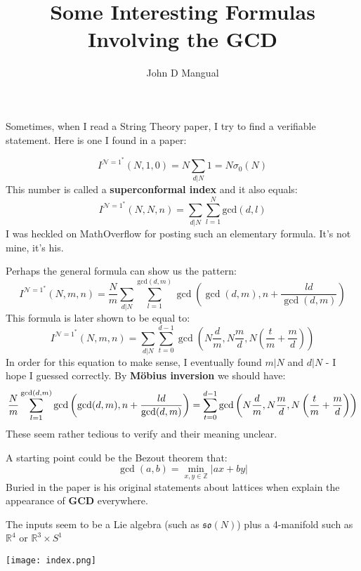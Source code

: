 \documentclass[12pt]{article}
\title{\textbf{ Some Interesting Formulas Involving the GCD }}
\author{John D Mangual}
\date{}
\begin{document}
\selectfont \fontsize{25}{30}\selectfont

\maketitle

Sometimes, when I read a String Theory paper, I try to find a verifiable statement.  Here is one I found in a paper:

$$ I^{\mathcal{N}=1^\ast}(N,1,0) = N \sum_{d| N} 1 = N \sigma_0(N) $$
This number is called a \textbf{superconformal index} and it also equals: 
$$ I^{\mathcal{N}=1^\ast}(N,N,n) =  \sum_{d| N} \sum_{l=1}^N \mathrm{gcd}(d,l ) $$
I was heckled on MathOverflow for posting such an elementary formula.  It's not mine, it's his.
\newpage

Perhaps the general formula can show us the pattern:
$$  I^{\mathcal{N}=1^\ast}(N,m,n) = \frac{N}{m} \sum_{d|N} \sum_{l=1}^{\mathrm{gcd}(d,m)}
\gcd\left( \gcd(d,m), n + \frac{ld}{\gcd(d,m)} \right)
$$
This formula is later shown to be equal to:
$$  I^{\mathcal{N}=1^\ast}(N,m,n) = 
 \sum_{d|N} \sum_{t=0}^{d-1} \gcd \left(N \frac{d}{m}, N \frac{m}{d}, N \left( \frac{t}{m} + \frac{m}{d} \right) \right)
$$
In order for this equation to make sense, I eventually found $m | N$ and $d | N$ - I hope I guessed correctly.  \newline \newline
By \textbf{M\"{o}bius inversion} we should have:
$$ \tiny \frac{N}{m}  \sum_{l=1}^{\mathrm{gcd}(d,m)}
\gcd\left( \gcd(d,m), n + \frac{ld}{\gcd(d,m)} \right)
= 
 \sum_{t=0}^{d-1} \gcd \left(N \frac{d}{m}, N \frac{m}{d}, N \left( \frac{t}{m} + \frac{m}{d} \right) \right)$$
These seem rather tedious to verify and their meaning unclear.

\newpage

A starting point could be the Bezout theorem that:
$$ \gcd(a,b) = \min_{x,y \in \mathbb{Z}} |ax + by |$$
Buried in the paper is his original statements about lattices when explain the appearance of \textbf{GCD} everywhere.

\newpage

The inputs seem to be a Lie algebra (such as $\mathfrak{so}(N)$) plus a 4-manifold such as $\mathbb{R}^4$ or $\mathbb{R}^3\times S^1$ 

\texttt{[image: index.png]}

\newpage

\selectfont \fontsize{12}{10}\selectfont
\end{document}
